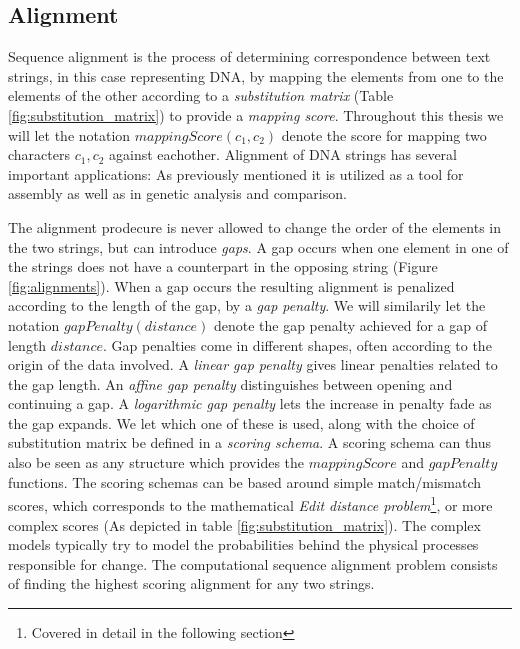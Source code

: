 \documentclass[thesis.tex]{subfiles}
\begin{document}
\subsection{Alignment}
\label{sec:alignment}
Sequence alignment is the process of determining correspondence between text strings, in this case representing DNA, by mapping the elements from one to the elements of the other according to a \textit{substitution matrix} (Table \ref{fig:substitution_matrix}) to provide a \textit{mapping score}. Throughout this thesis we will let the notation $mappingScore(c_1,c_2)$ denote the score for mapping two characters $c_1, c_2$ against eachother. Alignment of DNA strings has several important applications: As previously mentioned it is utilized as a tool for assembly as well as in genetic analysis and comparison.\\
\par\noindent
The alignment prodecure is never allowed to change the order of the elements in the two strings, but can introduce \textit{gaps}. A gap occurs when one element in one of the strings does not have a counterpart in the opposing string (Figure \ref{fig:alignments}). When a gap occurs the resulting alignment is penalized according to the length of the gap, by a \textit{gap penalty}. We will similarily let the notation $gapPenalty(distance)$ denote the gap penalty achieved for a gap of length $distance$. Gap penalties come in different shapes, often according to the origin of the data involved. A \textit{linear gap penalty} gives linear penalties related to the gap length. An \textit{affine gap penalty} distinguishes between opening and continuing a gap. A \textit{logarithmic gap penalty} lets the increase in penalty fade as the gap expands. We let which one of these is used, along with the choice of substitution matrix be defined in a \textit{scoring schema}. A scoring schema can thus also be seen as any structure which provides the $mappingScore$ and $gapPenalty$ functions. The scoring schemas can be based around simple match/mismatch scores, which corresponds to the mathematical \textit{Edit distance problem}\footnote{Covered in detail in the following section}, or more complex scores (As depicted in table \ref{fig:substitution_matrix}). The complex models typically try to model the probabilities behind the physical processes responsible for change. The computational sequence alignment problem consists of finding the highest scoring alignment for any two strings.\\
\par\noindent
\setlength{\intextsep}{0mm}
\end{document}
